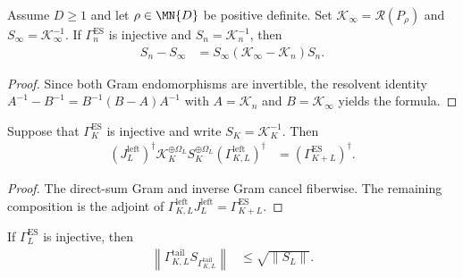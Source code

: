 \begin{lemma}
    \label{thm:inverse_gram_limiting_resolvent}
    \leanok
    Assume $D\geq1$ and let $\rho\in\MN{D}$ be positive definite.  Set
    $\mathcal K_\infty=\mathscr R(P_\rho)$ and
    $S_\infty=\mathcal K_\infty^{-1}$.  If
    $\Gamma_n^{\mathrm{ES}}$ is injective and
    $S_n=\mathcal K_n^{-1}$, then
    \begin{align}
        S_n-S_\infty
         & =S_\infty(\mathcal K_\infty-\mathcal K_n)S_n.
    \end{align}
\end{lemma}

\begin{proof}
    \leanok
    Since both Gram endomorphisms are invertible, the resolvent identity
    $A^{-1}-B^{-1}=B^{-1}(B-A)A^{-1}$ with
    $A=\mathcal K_n$ and $B=\mathcal K_\infty$ yields the formula.
\end{proof}

\begin{lemma}
    \label{thm:left_finite_gram_cancellation}
    \leanok
    Suppose that $\Gamma_K^{\mathrm{ES}}$ is injective and write
    $S_K=\mathcal K_K^{-1}$.  Then
    \begin{align}
        (J_L^{\mathrm{left}})^\dagger
        \mathcal K_K^{\oplus\Omega_L}S_K^{\oplus\Omega_L}
        (\Gamma_{K,L}^{\mathrm{left}})^\dagger
         & =(\Gamma_{K+L}^{\mathrm{ES}})^\dagger.
    \end{align}
\end{lemma}

\begin{proof}
    \leanok
    The direct-sum Gram and inverse Gram cancel fiberwise.  The remaining
    composition is the adjoint of
    $\Gamma_{K,L}^{\mathrm{left}}J_L^{\mathrm{left}}
        =\Gamma_{K+L}^{\mathrm{ES}}$.
\end{proof}

\begin{lemma}
    \label{thm:tail_spectator_pseudoinverse_bound}
    \leanok
    If $\Gamma_L^{\mathrm{ES}}$ is injective, then
    \begin{align}
        \left\lVert\Gamma_{K,L}^{\mathrm{tail}}
        S_{\Gamma_{K,L}^{\mathrm{tail}}}\right\rVert
         & \leq\sqrt{\lVert S_L\rVert}.
    \end{align}
\end{lemma}

